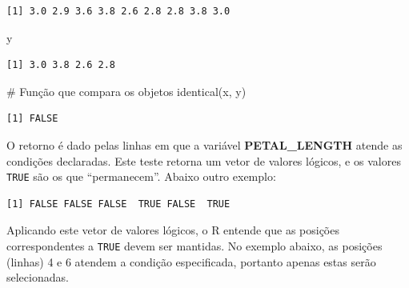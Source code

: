 \documentclass[
  letterpaper,
  DIV=11,
  numbers=noendperiod]{scrreprt}
\newenvironment{Shaded}{\begin{snugshade}}{\end{snugshade}}
\newcommand{\CommentTok}[1]{\textcolor[rgb]{0.37,0.37,0.37}{#1}}
\newcommand{\FloatTok}[1]{\textcolor[rgb]{0.68,0.00,0.00}{#1}}
\newcommand{\FunctionTok}[1]{\textcolor[rgb]{0.28,0.35,0.67}{#1}}
\newcommand{\NormalTok}[1]{\textcolor[rgb]{0.00,0.23,0.31}{#1}}
\newcommand{\OtherTok}[1]{\textcolor[rgb]{0.00,0.23,0.31}{#1}}
\newcommand{\SpecialCharTok}[1]{\textcolor[rgb]{0.37,0.37,0.37}{#1}}
\begin{document}
\begin{verbatim}
[1] 3.0 2.9 3.6 3.8 2.6 2.8 2.8 3.8 3.0
\end{verbatim}

\begin{Shaded}
\begin{Highlighting}[]
\NormalTok{y}
\end{Highlighting}
\end{Shaded}

\begin{verbatim}
[1] 3.0 3.8 2.6 2.8
\end{verbatim}

\begin{Shaded}
\begin{Highlighting}[]
\CommentTok{\# Função que compara os objetos}
\FunctionTok{identical}\NormalTok{(x, y)}
\end{Highlighting}
\end{Shaded}

\begin{verbatim}
[1] FALSE
\end{verbatim}

O retorno é dado pelas linhas em que a variável \textbf{PETAL\_LENGTH}
atende as condições declaradas. Este teste retorna um vetor de valores
lógicos, e os valores \texttt{TRUE} são os que ``permanecem''. Abaixo
outro exemplo:

\begin{Shaded}
\end{Shaded}

\begin{verbatim}
[1] FALSE FALSE FALSE  TRUE FALSE  TRUE
\end{verbatim}

Aplicando este vetor de valores lógicos, o R entende que as posições
correspondentes a \texttt{TRUE} devem ser mantidas. No exemplo abaixo,
as posições (linhas) 4 e 6 atendem a condição especificada, portanto
apenas estas serão selecionadas.

\begin{Shaded}
\end{Shaded}
\end{document}
